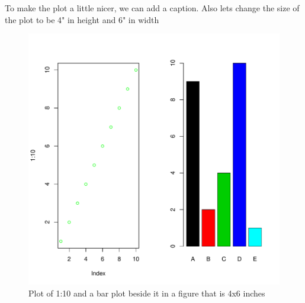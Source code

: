To make the plot a little nicer, we can add a caption. Also lets change the size of the plot to be 4" in height and 6" in width

\begin{figure}
\begin{knitrout}
\color{fgcolor}\begin{kframe}
\begin{alltt}
\hlstd{(}\hlstd{=}\hlstd{(}\hlstd{,}\hlstd{))}
\hlstd{(}\hlopt{:}\hlstd{,} \hlstd{=}\hlstd{,} \hlstd{=}\hlstd{)}
\hlstd{(}\hlstd{=}\hlstd{(}\hlopt{:}\hlstd{,}\hlstd{),} \hlstd{=LETTERS[}\hlopt{:}\hlstd{],} \hlstd{=}\hlopt{:}\hlstd{)}
\end{alltt}
\end{kframe}
\includegraphics[width=\maxwidth]{figure/test3-1} 

\end{knitrout}

\caption{Plot of 1:10 and a bar plot beside it in a figure that is 4x6 inches}

\end{figure}

